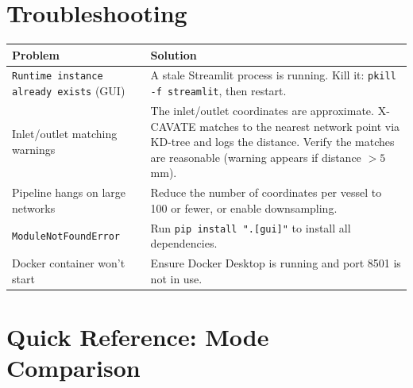 \documentclass[11pt,letterpaper]{article}
\newcommand{\code}[1]{\texttt{#1}}
\begin{document}
\section{Troubleshooting}

\begin{longtable}{@{}L{4cm}p{10cm}@{}}
\toprule
\textbf{Problem} & \textbf{Solution} \\
\midrule
\texttt{Runtime instance already exists} (GUI) & A stale Streamlit process is running. Kill it: \code{pkill -f streamlit}, then restart. \\
Inlet/outlet matching warnings & The inlet/outlet coordinates are approximate. X-CAVATE matches to the nearest network point via KD-tree and logs the distance. Verify the matches are reasonable (warning appears if distance $> 5$\,mm). \\
Pipeline hangs on large networks & Reduce the number of coordinates per vessel to 100 or fewer, or enable downsampling. \\
\texttt{ModuleNotFoundError} & Run \code{pip install ".[gui]"} to install all dependencies. \\
Docker container won't start & Ensure Docker Desktop is running and port 8501 is not in use. \\
\bottomrule
\end{longtable}


\section{Quick Reference: Mode Comparison}
\end{document}
